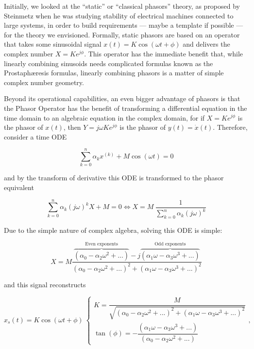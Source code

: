 	Initially, we looked at the ``static'' or ``classical phasors'' theory, as proposed by Steinmetz when he was studying stability of electrical machines connected to large systems, in order to build requirements — maybe a template if possible — for the theory we envisioned. Formally, static phasors are based on an operator that takes some sinusoidal signal $x(t) = K\cos\left(\omega t + \phi\right)$ and delivers the complex number $X = Ke^{j\phi}$. This operator has the immediate benefit that, while linearly combining sinusoids needs complicated formulas known as the Prostaph\ae resis formulas, linearly combining phasors is a matter of simple complex number geometry.

	Beyond its operational capabilities, an even bigger advantage of phasors is that the Phasor Operator has the benefit of transforming a differential equation in the time domain to an algebraic equation in the complex domain, for if $X = Ke^{j\phi}$ is the phasor of $x(t)$, then $Y = j\omega K e^{j\phi}$ is the phasor of $y(t) = \dot{x}(t)$. Therefore, consider a time ODE

\begin{equation} \sum_{k=0}^n \alpha_k x^{(k)} + M\cos\left(\omega t\right) = 0 \label{eq:steinmets_ode}\end{equation}

	\noindent and by the transform of derivative this ODE is transformed to the phasor equivalent

\begin{equation} \sum_{k=0}^n \alpha_k \left(j\omega\right)^k X + M = 0 \Leftrightarrow X = M\ \dfrac{1}{\displaystyle\sum_{k=0}^n \alpha_k \left(j\omega\right)^k} \label{eq:steinmets_ode_algebraic}\end{equation}

	Due to the simple nature of complex algebra, solving this ODE is simple:

\begin{equation} X = M\dfrac{\overbrace{\left(\alpha_0 - \alpha_2\omega^2 + ...\right)}^{\text{Even exponents}} - j\overbrace{\left(\alpha_1\omega - \alpha_3\omega^3 + ...\right)}^{\text{Odd exponents}}}{\left(\alpha_0 - \alpha_2\omega^2 + ...\right)^2 + \left(\alpha_1\omega - \alpha_3\omega^3 + ...\right)^2} \label{eq:netgrid_original_phasor_sol}\end{equation}

	\noindent and this signal reconstructs

\begin{equation} x_s(t) = K\cos\left(\omega t + \phi\right)\ \left\{\begin{array}{l} K = \dfrac{M}{\sqrt{\left(\alpha_0 - \alpha_2\omega^2 + ...\right)^2 + \left(\alpha_1\omega - \alpha_3\omega^3 + ...\right)^2}}\\[10mm] \tan\left(\phi\right) = -\dfrac{\left(\alpha_1\omega - \alpha_3\omega^3 + ...\right)}{\left(\alpha_0 - \alpha_2\omega^2 + ...\right)} \end{array}\right. ,\end{equation}

